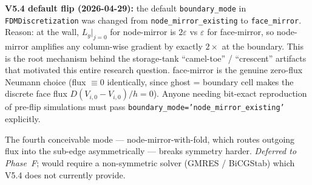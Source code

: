 \documentclass[11pt,letterpaper]{article}
\begin{document}
\textbf{V5.4 default flip (2026-04-29):} the default \texttt{boundary\_mode}
in \texttt{FDMDiscretization} was changed from \texttt{node\_mirror\_existing}
to \texttt{face\_mirror}. Reason: at the wall, $L_y\big|_{j=0}$ for node-mirror
is $2\varepsilon$ vs $\varepsilon$ for face-mirror, so node-mirror amplifies
any column-wise gradient by exactly $2\times$ at the boundary. This is the
root mechanism behind the storage-tank ``camel-toe'' / ``crescent''
artifacts that motivated this entire research question. face-mirror is the
genuine zero-flux Neumann choice (flux $\equiv 0$ identically, since
ghost = boundary cell makes the discrete face flux $D(V_{i,0}-V_{i,0})/h = 0$).
Anyone needing bit-exact reproduction of pre-flip simulations must pass
\texttt{boundary\_mode='node\_mirror\_existing'} explicitly.

The fourth conceivable mode --- node-mirror-with-fold, which routes outgoing flux into the sub-edge asymmetrically --- breaks symmetry harder. \emph{Deferred to Phase~F}; would require a non-symmetric solver (GMRES / BiCGStab) which V5.4 does not currently provide.
\end{document}
